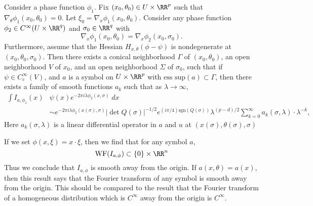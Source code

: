 \begin{theorem}
    Consider a phase function $\phi_1$. Fix $(x_0,\theta_0) \in U \times \RR^p$ such that $\nabla_\theta \phi_1(x_0,\theta_0) = 0$. Let $\xi_0 = \nabla_x \phi_1(x_0,\theta_0)$. Consider any phase function $\phi_2 \in C^\infty(U \times \RR^q)$ and $\sigma_0 \in \RR^q$ with
    \[ \nabla_x \phi_1(x_0,\theta_0) = \nabla_x \phi_2(x_0,\sigma_0). \]
    Furthermore, assume that the Hessian $H_{x,\theta} (\phi - \psi)$ is nondegenerate at $(x_0,\theta_0,\sigma_0)$. Then there exists a conical neighborhood $\Gamma$ of $(x_0,\theta_0)$, an open neighborhood $V$ of $x_0$, and an open neighborhood $\Sigma$ of $\sigma_0$, such that if $\psi \in C_c^\infty(V)$, and $a$ is a symbol on $U \times \RR^p$ with $\text{ess sup}(a) \subset \Gamma$, then there exists a family of smooth functions $a_k$ such that as $\lambda \to \infty$,
    \begin{align*}
        \int I_{a,\phi_1}(x) & \psi(x) e^{-2 \pi i \lambda \phi_2(x,\sigma)}\; dx\\
        &\sim e^{-2 \pi i \lambda \phi_2(x(\sigma),\sigma)} |\det Q(\sigma)|^{-1/2} e^{(i \pi/4) \text{sgn}(Q(\sigma))} \lambda^{(p-d)/2} \sum_{k = 0}^\infty a_k(\sigma,\lambda) \cdot \lambda^{-k},
    \end{align*}
    Here $a_k(\sigma,\lambda)$ is a linear differential operator in $a$ and $u$ at $(x(\sigma), \theta(\sigma), \sigma)$
\end{theorem}

\begin{example}
    If we set $\phi(x,\xi) = x \cdot \xi$, then we find that for any symbol $a$,
    \[ \text{WF}(I_{a,\phi}) \subset \{ 0 \} \times \RR^n \]
    Thus we conclude that $I_{a,\phi}$ is smooth away from the origin. If $a(x,\theta) = a(x)$, then this result says that the Fourier transform of any symbol is smooth away from the origin. This should be compared to the result that the Fourier transform of a homogeneous distribution which is $C^\infty$ away from the origin is $C^\infty$.
\end{example}

